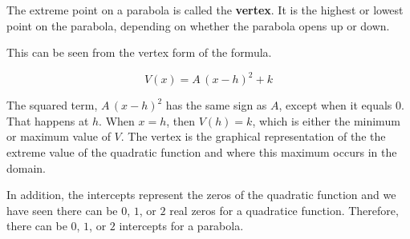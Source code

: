 \documentclass{ximera}
\begin{document}
\begin{image}
\end{image}










The extreme point on a parabola is called the \textbf{vertex}.  It is the highest or lowest point on the parabola, depending on whether the parabola opens up or down. 

This can be seen from the vertex form of the formula.




\[
V(x) = A \, (x - h)^2 + k
\]

The squared term, $A \, (x - h)^2$ has the same sign as $A$, except when it equals $0$.  That happens at $h$.  When $x = h$, then $V(h) = k$, which is either the minimum or maximum value of $V$.  The vertex is the graphical representation of the the extreme value of the quadratic function and where this maximum occurs in the domain.


In addition, the intercepts represent the zeros of the quadratic function and we have seen there can be $0$, $1$, or $2$ real zeros for a quadratice function.  Therefore, there can be $0$, $1$, or $2$ intercepts for a parabola.
\end{document}
